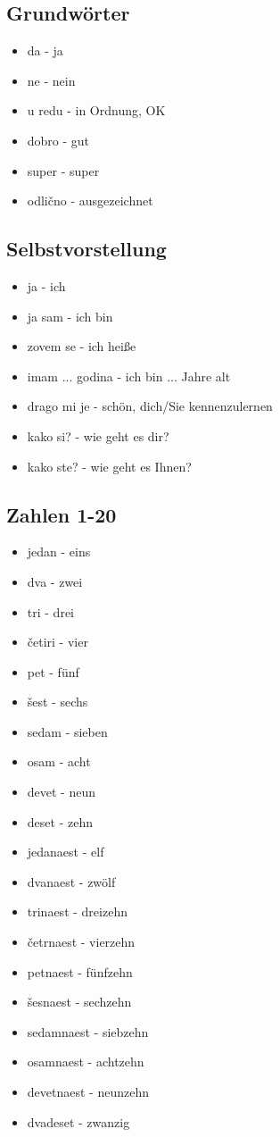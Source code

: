 \subsection*{Grundwörter}
\begin{itemize}
    \item da - ja
    \item ne - nein
    \item u redu - in Ordnung, OK
    \item dobro - gut
    \item super - super
    \item odlično - ausgezeichnet
\end{itemize}

\subsection*{Selbstvorstellung}
\begin{itemize}
    \item ja - ich
    \item ja sam - ich bin
    \item zovem se - ich heiße
    \item imam ... godina - ich bin ... Jahre alt
    \item drago mi je - schön, dich/Sie kennenzulernen
    \item kako si? - wie geht es dir?
    \item kako ste? - wie geht es Ihnen?
\end{itemize}

\subsection*{Zahlen 1-20}
\begin{itemize}
    \item jedan - eins
    \item dva - zwei
    \item tri - drei
    \item četiri - vier
    \item pet - fünf
    \item šest - sechs
    \item sedam - sieben
    \item osam - acht
    \item devet - neun
    \item deset - zehn
    \item jedanaest - elf
    \item dvanaest - zwölf
    \item trinaest - dreizehn
    \item četrnaest - vierzehn
    \item petnaest - fünfzehn
    \item šesnaest - sechzehn
    \item sedamnaest - siebzehn
    \item osamnaest - achtzehn
    \item devetnaest - neunzehn
    \item dvadeset - zwanzig
\end{itemize}

